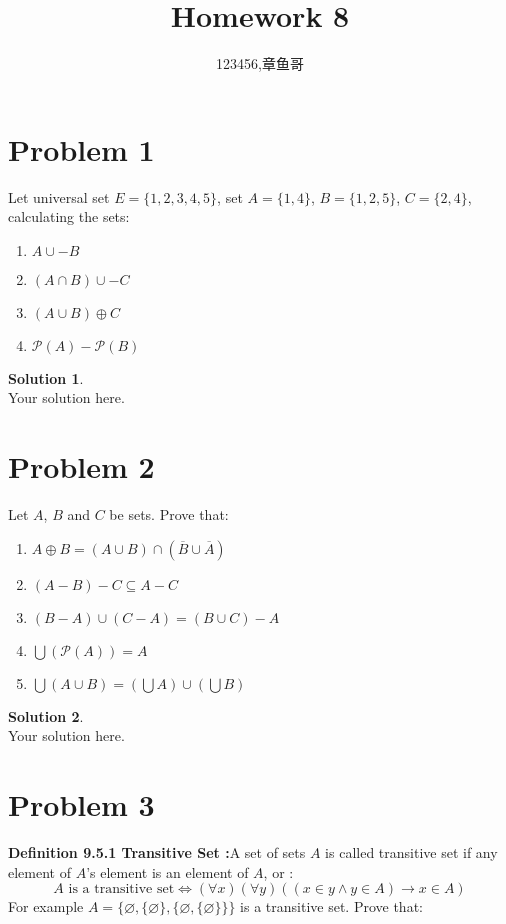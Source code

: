 \documentclass[a4paper,UTF8]{article}
\theoremstyle{definition}
\newtheorem*{solution}{Solution}
\begin{document}
\title{Homework 8}
\author{123456,章鱼哥}
\maketitle


\section*{Problem 1}
Let universal set $E=\{1,2,3,4,5\}$, set $A=\{1,4\}$, $B=\{1,2,5\}$, $C=\{2,4\}$, calculating the sets:
\begin{enumerate}
	\item $A\cup -B$
	\item $(A\cap B)\cup -C$
	\item $(A \cup B)\oplus C$
	\item $\mathcal{P}(A) - \mathcal{P}(B)$
\end{enumerate}


\begin{solution}
	~\\
	Your solution here.
\end{solution}



\section*{Problem 2}
Let $A$, $B$ and $C$ be sets. Prove that:
\begin{enumerate}
	\item $A\oplus B = (A\cup B) \cap (\overline{B}\cup \overline{A})$
	\item $(A-B) -C \subseteq A-C$
	\item $(B-A) \cup (C-A) = (B\cup C)-A$
	\item $\bigcup (\mathcal{P}(A))=A$
	\item $\bigcup (A\cup B)=(\bigcup A)\cup (\bigcup B)$
\end{enumerate}


\begin{solution}
	~\\
	Your solution here.
\end{solution}

\section*{Problem 3}
\textbf{Definition 9.5.1 Transitive Set :}A set of sets $A$ is called transitive set if any element of $A$'s element is an element of $A$, or :
$$A\text{ is a transitive set}\Leftrightarrow (\forall x)(\forall y)((x\in y\land y\in A)\rightarrow x\in A)$$
For example $A=\{\varnothing,\{\varnothing\},\{\varnothing,\{\varnothing\}\}\}$ is a transitive set. Prove that:
\end{document}
